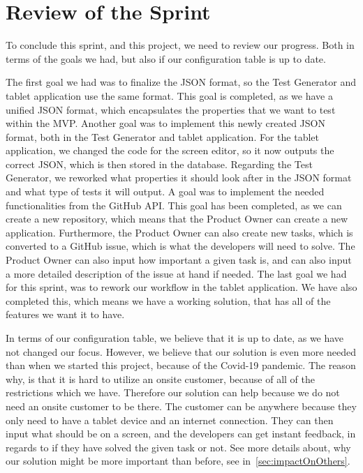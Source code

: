 \section{Review of the Sprint}
To conclude this sprint, and this project, we need to review our progress.
Both in terms of the goals we had, but also if our configuration table is up to date.

The first goal we had was to finalize the JSON format, so the Test Generator and tablet application use the same format.
This goal is completed, as we have a unified JSON format, which encapsulates the properties that we want to test within the MVP.
Another goal was to implement this newly created JSON format, both in the Test Generator and tablet application.
For the tablet application, we changed the code for the screen editor, so it now outputs the correct JSON, which is then stored in the database.
Regarding the Test Generator, we reworked what properties it should look after in the JSON format and what type of tests it will output.
A goal was to implement the needed functionalities from the GitHub API.
This goal has been completed, as we can create a new repository, which means that the Product Owner can create a new application.
Furthermore, the Product Owner can also create new tasks, which is converted to a GitHub issue, which is what the developers will need to solve.
The Product Owner can also input how important a given task is, and can also input a more detailed description of the issue at hand if needed.
The last goal we had for this sprint, was to rework our workflow in the tablet application.
We have also completed this, which means we have a working solution, that has all of the features we want it to have.

In terms of our configuration table, we believe that it is up to date, as we have not changed our focus.
However, we believe that our solution is even more needed than when we started this project, because of the Covid-19 pandemic.
The reason why, is that it is hard to utilize an onsite customer, because of all of the restrictions which we have.
Therefore our solution can help because we do not need an onsite customer to be there.
The customer can be anywhere because they only need to have a tablet device and an internet connection.
They can then input what should be on a screen, and the developers can get instant feedback, in regards to if they have solved the given task or not.
See more details about, why our solution might be more important than before, see in~\autoref{sec:impactOnOthers}.
